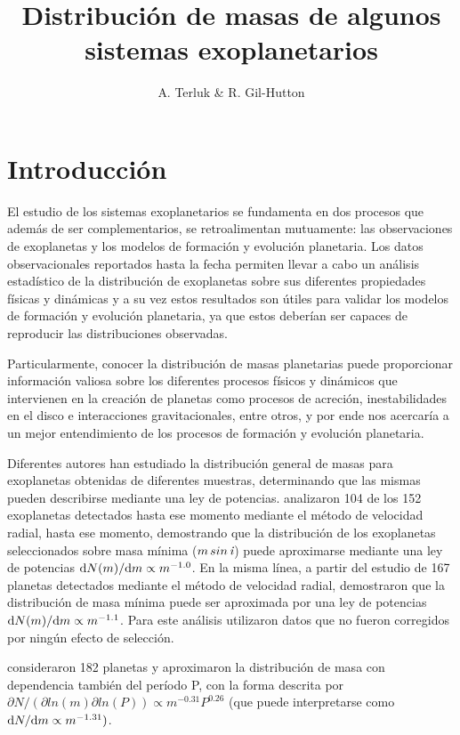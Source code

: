 \documentclass[baaa]{baaa}
\title{Distribución de masas de algunos sistemas exoplanetarios}
\author{
A. Terluk\inst{1}
\&
R. Gil-Hutton\inst{1,2}
}
\institute{Departamento de Geofísica y Astronomía, Facultad de Ciencias Exactas, Físicas y Naturales, UNSJ, Argentina \and Consejo Nacional de Investigaciones Científicas y Técnicas, Argentina}
\begin{document}
\maketitle
\section{Introducción}
El estudio de los sistemas exoplanetarios se fundamenta en dos procesos que además de ser complementarios, se retroalimentan mutuamente: las observaciones de exoplanetas y los modelos de formación y evolución planetaria. Los datos observacionales reportados hasta la fecha permiten llevar a cabo un análisis estadístico de la distribución de exoplanetas sobre sus diferentes propiedades físicas y dinámicas y a su vez estos resultados son útiles para validar los modelos de formación y evolución planetaria, ya que estos deberían ser capaces de reproducir las distribuciones observadas.  

Particularmente, conocer la distribución de masas planetarias puede proporcionar información valiosa sobre los diferentes procesos físicos y dinámicos que intervienen en la creación de planetas como procesos de acreción, inestabilidades en el disco e interacciones gravitacionales, entre otros, y por ende nos acercaría a un mejor entendimiento de los procesos de formación y evolución planetaria.

Diferentes autores han estudiado la distribución general de masas para exoplanetas obtenidas de diferentes muestras, determinando que las mismas pueden describirse mediante una ley de potencias. \citet{marcy2005} analizaron 104 de los 152 exoplanetas detectados hasta ese momento mediante el método de velocidad radial, hasta ese momento, demostrando que la distribución de los exoplanetas seleccionados sobre masa mínima ($ m \hspace{0.5mm} sin \hspace{0.5mm} \textit {i} $) puede aproximarse mediante una ley de potencias $ {\rm d} N(m)/{\rm d} m \propto m^{-1.0}$. En la misma línea, a partir del estudio de 167 planetas detectados mediante el método de velocidad radial, \citet{butler2006} demostraron que la distribución de masa mínima puede ser aproximada por una ley de potencias ${\rm d} N(m)/ {\rm d} m \propto m^{-1.1}$. Para este análisis \citet{butler2006} utilizaron datos que no fueron corregidos por ningún efecto de selección.

\citet{cumming2008} consideraron 182 planetas y aproximaron la distribución de masa con dependencia también del período P, con la forma descrita por $ \partial N/ (\partial ln(m) \partial ln (P)) \propto m^{-0.31} P ^{0.26} $ (que puede interpretarse como $ {\rm d} N/{\rm d} m \propto m ^{-1.31})$.
\end{document}

